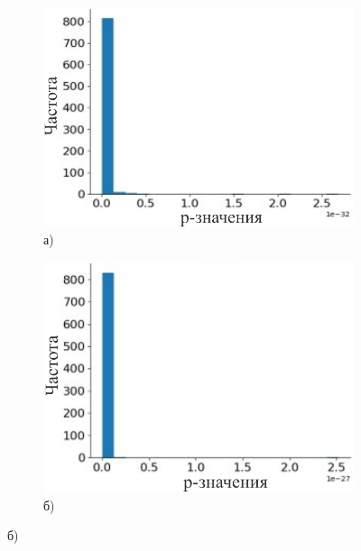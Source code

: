 \begin{figure}[H]
    \centering
    \begin{subfigure}[b]{0.45\textwidth}
        \centering
        \includegraphics[width=\textwidth]{media/ict/image7}
        \caption*{а)}
    \end{subfigure}
    \hfill
    \begin{subfigure}[b]{0.45\textwidth}
        \centering
        \includegraphics[width=\textwidth]{media/ict/image8}
        \caption*{б)}
    \end{subfigure}

    \par\bigskip


\end{figure}
